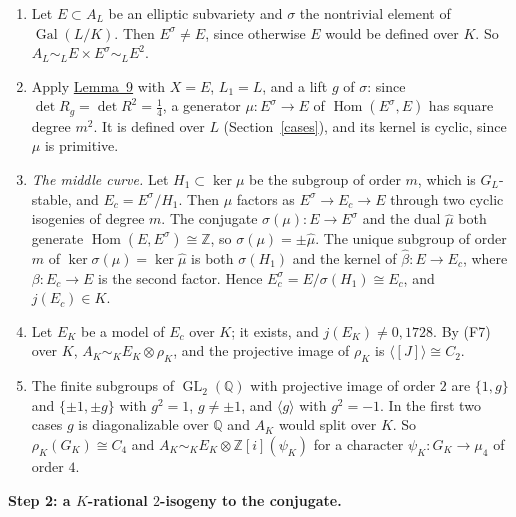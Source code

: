 \documentclass[11pt]{article}
\newcommand{\Q}{\mathbb Q}
\newcommand{\Z}{\mathbb Z}
\DeclareMathOperator{\Gal}{Gal}
\DeclareMathOperator{\GL}{GL}
\DeclareMathOperator{\Hom}{Hom}
\begin{document}
\begin{enumerate}
\item Let \(E\subset A_L\) be an elliptic subvariety and \(\sigma\) the nontrivial element of \(\Gal(L/K)\).
          Then \(E^\sigma\neq E\), since otherwise \(E\) would be defined over \(K\). So
          \(A_L\sim_L E\times E^\sigma\sim_L E^2\).
\item Apply \hyperref[lemma-degree]{Lemma~9} with \(X=E\), \(L_1=L\), and a lift \(g\) of \(\sigma\): since
          \(\det R_g=\det R^2=\tfrac14\), a generator \(\mu:E^\sigma\to E\) of \(\Hom(E^\sigma,E)\) has square
          degree \(m^2\). It is defined over \(L\) (Section~\ref{cases}), and its kernel is cyclic, since \(\mu\) is
          primitive.
\item \emph{The middle curve.} Let \(H_1\subset\ker\mu\) be the subgroup of order \(m\), which is
          \(G_L\)-stable, and \(E_c=E^\sigma/H_1\). Then \(\mu\) factors as \(E^\sigma\to E_c\to E\) through two cyclic
          isogenies of degree \(m\). The conjugate \(\sigma(\mu):E\to E^\sigma\) and the dual \(\hat\mu\) both
          generate \(\Hom(E,E^\sigma)\cong\Z\), so \(\sigma(\mu)=\pm\hat\mu\). The unique subgroup of order \(m\)
          of \(\ker\sigma(\mu)=\ker\hat\mu\) is both \(\sigma(H_1)\) and the kernel of
          \(\hat\beta:E\to E_c\), where \(\beta:E_c\to E\) is the second factor. Hence
          \(E_c^\sigma=E/\sigma(H_1)\cong E_c\), and \(j(E_c)\in K\).
\item Let \(E_K\) be a model of \(E_c\) over \(K\); it exists, and \(j(E_K)\neq0,1728\). By (F7) over \(K\),
          \(A_K\sim_K E_K\otimes\rho_K\), and the projective image of \(\rho_K\) is \(\langle[J]\rangle\cong C_2\).
\item The finite subgroups of \(\GL_2(\Q)\) with projective image of order \(2\) are \(\{1,g\}\) and
          \(\{\pm1,\pm g\}\) with \(g^2=1\), \(g\neq\pm1\), and \(\langle g\rangle\) with \(g^2=-1\). In the first two
          cases \(g\) is diagonalizable over \(\Q\) and \(A_K\) would split over \(K\). So
          \(\rho_K(G_K)\cong C_4\) and \(A_K\sim_K E_K\otimes\Z[i](\psi_K)\) for a character
          \(\psi_K:G_K\to\mu_4\) of order \(4\).
\end{enumerate}

\textbf{Step 2: a \(K\)-rational \(2\)-isogeny to the conjugate.}
\end{document}
